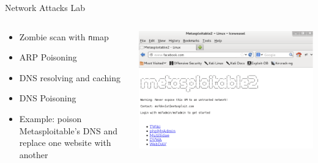 \documentclass{beamer}
\begin{document}
	\begin{frame}{Network Attacks Lab}
            		\begin{columns}
             		\begin{column}{0.5\textwidth}
                			\begin{itemize}
                    			\item Zombie scan with {\texttt nmap}
                    			\item ARP Poisoning
					\item DNS resolving and caching
                    			\item DNS Poisoning
					\item Example: poison Metasploitable's DNS and replace one website with another
                			\end{itemize}
              		\end{column}
            
            		\begin{column}{0.5\textwidth}
				\begin{center}
                 		\includegraphics[width=\textwidth]{../labs/network-attacks/the-new-facebook.png}
				\end{center}
              		\end{column}
            		\end{columns}				
	\end{frame}		
	
\end{document}
